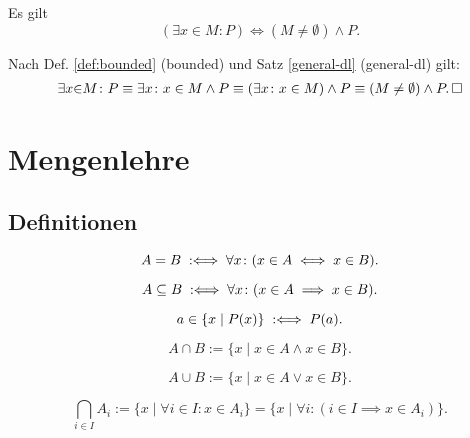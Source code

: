 \begin{Satz}
Es gilt
\[(\exists x{\in}M\colon P) \iff (M\ne\emptyset)\land P.\]
\end{Satz}

\begin{Beweis}
Nach Def. \ref{def:bounded} (bounded) und Satz
\ref{general-dl} (general-dl) gilt:
\begin{gather*}
\exists x{\in}M\colon P \equiv \exists x\colon x\in M\land P
\equiv (\exists x\colon x\in M)\land P\equiv (M\ne\emptyset)\land P.\,\square
\end{gather*}
\end{Beweis}

\newpage
\section{Mengenlehre}
\subsection{Definitionen}

\begin{Definition}
\label{def:seteq}
\[A=B \;:\Longleftrightarrow\; \forall x\colon (x\in A\iff x\in B).\]
\end{Definition}

\begin{Definition}%
\label{def:subseteq}
\[A\subseteq B \;:\Longleftrightarrow\; \forall x\colon (x\in A\implies x\in B).\]
\end{Definition}

\begin{Definition}\label{def:filter}
\[a\in\{x\mid P(x)\} \;:\Longleftrightarrow\; P(a).\]
\end{Definition}

\begin{Definition}%
\label{def:cap}
\[A\cap B := \{x\mid x\in A\land x\in B\}.\]
\end{Definition}

\begin{Definition}%
\label{def:cup}
\[A\cup B := \{x\mid x\in A\lor x\in B\}.\]
\end{Definition}

\begin{Definition}\label{def:intersection}
\[\bigcap_{i\in I} A_i := \{x\mid \forall i{\in}I\colon x\in A_i\}
= \{x\mid \forall i\colon (i\in I\implies x\in A_i)\}.\]
\end{Definition}

